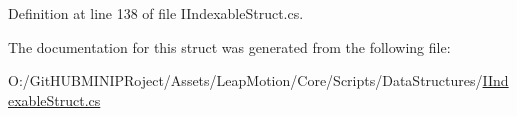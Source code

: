 Definition at line 138 of file I\+Indexable\+Struct.\+cs.



The documentation for this struct was generated from the following file\+:\begin{DoxyCompactItemize}
\item 
O\+:/\+Git\+H\+U\+B\+M\+I\+N\+I\+P\+Roject/\+Assets/\+Leap\+Motion/\+Core/\+Scripts/\+Data\+Structures/\mbox{\hyperlink{_i_indexable_struct_8cs}{I\+Indexable\+Struct.\+cs}}\end{DoxyCompactItemize}
